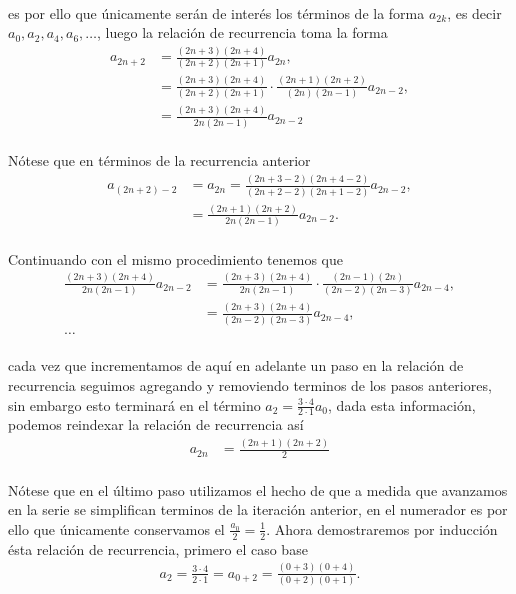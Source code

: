 \documentclass{article}
\begin{document}
\paragraph{}es por ello que únicamente serán de interés los términos de la forma $a_{2k}$, es decir $a_0, a_2, a_4, a_6, \dots$, luego la relación de recurrencia toma la forma
\begin{align*}
a_{2n+2} &= \frac{(2n+3)(2n+4)}{(2n+2)(2n+1)} a_{2n},\\
&= \frac{(2n+3)(2n+4)}{(2n+2)(2n+1)} \cdot \frac{(2n+1)(2n+2)}{(2n)(2n-1)} a_{2n-2},\\
&= \frac{(2n+3)(2n+4)}{2n(2n-1)} a_{2n-2}
\end{align*}
\paragraph{}Nótese que en términos de la recurrencia anterior
\begin{align*}
	a_{(2n+2)-2} &= a_{2n} = \frac{(2n+3-2)(2n+4-2)}{(2n+2-2)(2n+1-2)} a_{2n-2},\\
	&= \frac{(2n+1)(2n+2)}{2n(2n-1)} a_{2n-2}.
\end{align*}
\paragraph{} Continuando con el mismo procedimiento tenemos que 
\begin{align*}
\frac{(2n+3)(2n+4)}{2n(2n-1)} a_{2n-2} &= \frac{(2n+3)(2n+4)}{2n(2n-1)} \cdot \frac{(2n-1)(2n)}{(2n-2)(2n-3)}a_{2n-4},\\
&=\frac{(2n+3)(2n+4)}{(2n-2)(2n-3)} a_{2n-4},\\
\dots
\end{align*}
\paragraph{} cada vez que incrementamos de aquí en adelante un paso en la relación de recurrencia seguimos agregando y removiendo terminos de los pasos anteriores, sin embargo esto terminará en el término $a_2=\frac{3\cdot 4}{2 \cdot 1} a_0$, dada esta información, podemos reindexar la relación de recurrencia así
\begin{align*}
a_{2n} &= \frac{(2n+1)(2n+2)}{2}
\end{align*}
\paragraph{}Nótese que en el último paso utilizamos el hecho de que a medida que avanzamos en la serie se simplifican terminos de la iteración anterior, en el numerador es por ello que únicamente conservamos el $\frac{a_0}{2} = \frac{1}{2}$. Ahora demostraremos por inducción ésta relación de recurrencia, primero el caso base
\begin{align*}
a_2 = \frac{3 \cdot 4}{2 \cdot 1} = a_{0+2} = \frac{(0+3)(0+4)}{(0+2)(0+1)}.
\end{align*}
\end{document}
